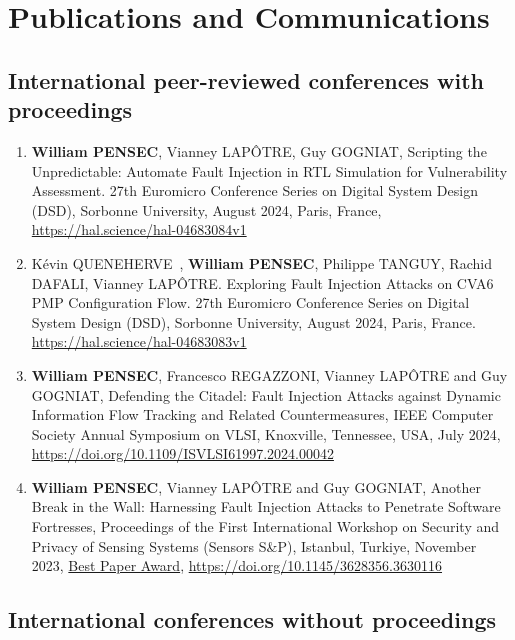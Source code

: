 \chapter{Publications and Communications}
\label{chapter:publi}
\section{International peer-reviewed conferences with proceedings}

\begin{enumerate}
    \item \textbf{William PENSEC}, Vianney LAPÔTRE, Guy GOGNIAT, Scripting the Unpredictable: Automate Fault Injection in RTL Simulation for Vulnerability Assessment. 27th Euromicro Conference Series on Digital System Design (DSD), Sorbonne University, August 2024, Paris, France, \url{https://hal.science/hal-04683084v1}
    \item Kévin QUENEHERVE~\cite{QPTDL-24-dsd}, \textbf{William PENSEC}, Philippe TANGUY, Rachid DAFALI, Vianney LAPÔTRE. Exploring Fault Injection Attacks on CVA6 PMP Configuration Flow. 27th Euromicro Conference Series on Digital System Design (DSD), Sorbonne University, August 2024, Paris, France. \url{https://hal.science/hal-04683083v1}
    \item \textbf{William PENSEC}, Francesco REGAZZONI, Vianney LAPÔTRE and Guy GOGNIAT, Defending the Citadel: Fault Injection Attacks against Dynamic Information Flow Tracking and Related Countermeasures, IEEE Computer Society Annual Symposium on VLSI, Knoxville, Tennessee, USA, July 2024, \url{https://doi.org/10.1109/ISVLSI61997.2024.00042}
    \item\textbf{William PENSEC}, Vianney LAPÔTRE and Guy GOGNIAT, Another Break in the Wall: Harnessing Fault Injection Attacks to Penetrate Software Fortresses, Proceedings of the First International Workshop on Security and Privacy of Sensing Systems (Sensors S\&P), Istanbul, Turkiye, November 2023, \underline{Best Paper Award}, \url{https://doi.org/10.1145/3628356.3630116}
\end{enumerate}
\section{International conferences without proceedings}

